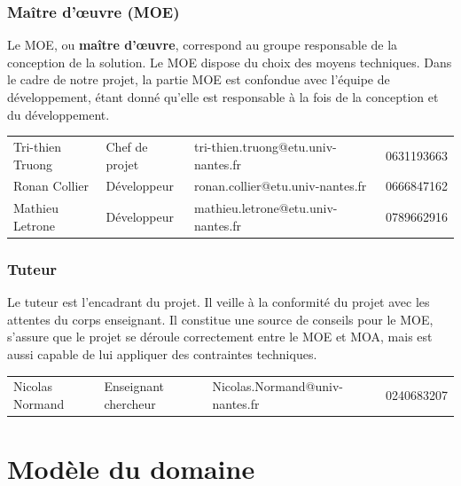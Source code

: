 \documentclass[12pt,titlepage,french]{article}
\begin{document}
\subsubsection*{Maître d'œuvre (MOE)}

Le MOE, ou \textbf{maître d'œuvre}, correspond au groupe responsable de la conception de la solution.
Le MOE dispose du choix des moyens techniques.
Dans le cadre de notre projet, la partie MOE est confondue avec l'équipe de développement, étant donné qu'elle est responsable à la fois de la conception et du développement.\\

\noindent\begin{tabu} to \textwidth {X[c2]X[c]X[c3]X[c]}\toprule
     &&                       &\\\toprule
Tri-thien Truong& Chef de projet&tri-thien.truong@etu.univ-nantes.fr&    0631193663\\\midrule
   Ronan Collier& Développeur&   ronan.collier@etu.univ-nantes.fr&    0666847162\\\midrule
 Mathieu Letrone& Développeur& mathieu.letrone@etu.univ-nantes.fr&    0789662916\\\bottomrule
\end{tabu}


\subsubsection*{Tuteur}

Le tuteur est l'encadrant du projet. Il veille à la conformité du projet avec les attentes du corps enseignant.
Il constitue une source de conseils pour le MOE, s'assure que le projet se déroule correctement entre le MOE et MOA, mais est aussi capable de lui appliquer des contraintes techniques.\\

\noindent\begin{tabu} to \textwidth {X[c2]X[c2]X[c3]X[c]}\toprule
     &&                       &\\\toprule
Nicolas Normand& Enseignant chercheur&Nicolas.Normand@univ-nantes.fr&    0240683207\\\bottomrule
\end{tabu}


\section{Modèle du domaine}
\end{document}
